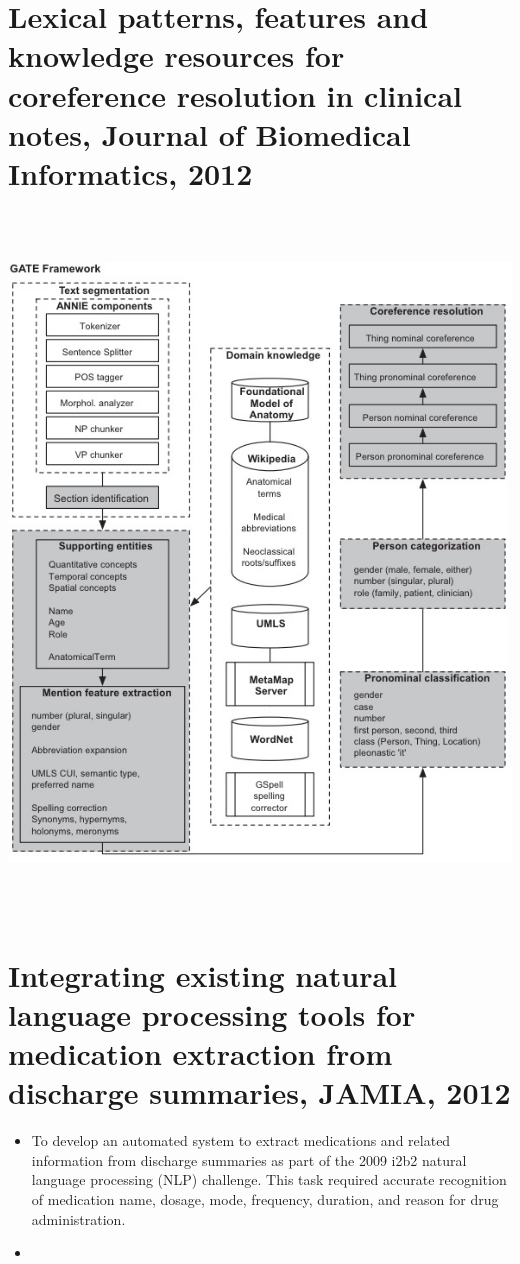 \documentclass[pdftext,twoside,11pt]{article}
\begin{document}
\section{Lexical patterns, features and knowledge resources for coreference resolution
in clinical notes, Journal of Biomedical Informatics, 2012}
\label{sec:intro} 
\begin{center}
      \includegraphics[height=50em]{system.jpg}
\end{center}

\section{Integrating existing natural language processing tools
for medication extraction from discharge summaries, JAMIA, 2012}
\label{sec:intro} 
\begin{itemize}
\item To develop an automated system to extract
medications and related information from discharge
summaries as part of the 2009 i2b2 natural language
processing (NLP) challenge. This task required accurate
recognition of medication name, dosage, mode,
frequency, duration, and reason for drug administration.
\item 
\end{itemize}
\end{document}
